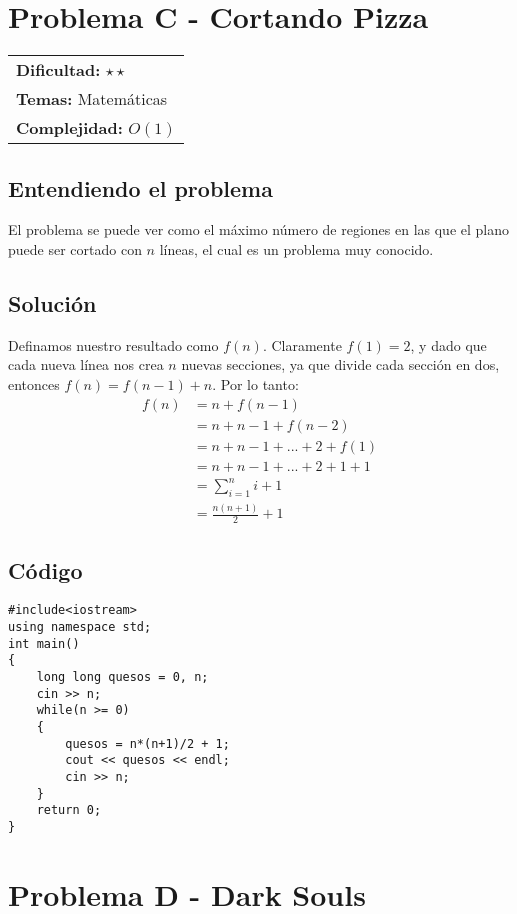 \section{Problema C - Cortando Pizza}

\hfill
\begin{tabular}{@{}l@{}}
\textbf{Dificultad:} $\star \star$ \\
\textbf{Temas:} Matemáticas\\
\textbf{Complejidad:} $O(1)$
\end{tabular}

\subsection*{Entendiendo el problema}
El problema se puede ver como el máximo número de regiones en las que el plano puede ser cortado con $n$ líneas, el cual es un problema muy conocido. 

\subsection*{Solución}
Definamos nuestro resultado como $f(n)$. Claramente $f(1) = 2$, y dado que cada nueva línea nos crea $n$ nuevas secciones, ya que divide cada sección en dos, entonces $f(n) = f(n-1) + n$.
Por lo tanto:
\begin{align*}
f(n) & = n + f(n-1) \\
     & = n + n-1 + f(n-2) \\
     & = n + n-1 + ... + 2 + f(1) \\
     & = n + n-1 + ... + 2 + 1 + 1 \\
     & = \sum_{i = 1}^n i + 1 \\
     & = \frac{n(n+1)}{2} + 1
\end{align*}
\subsection*{Código}
\begin{verbatim}
#include<iostream>
using namespace std;
int main()
{
    long long quesos = 0, n;
    cin >> n;
    while(n >= 0)
    {
        quesos = n*(n+1)/2 + 1;
        cout << quesos << endl;
        cin >> n;
    }
    return 0;
}
\end{verbatim}

\section{Problema D - Dark Souls}

